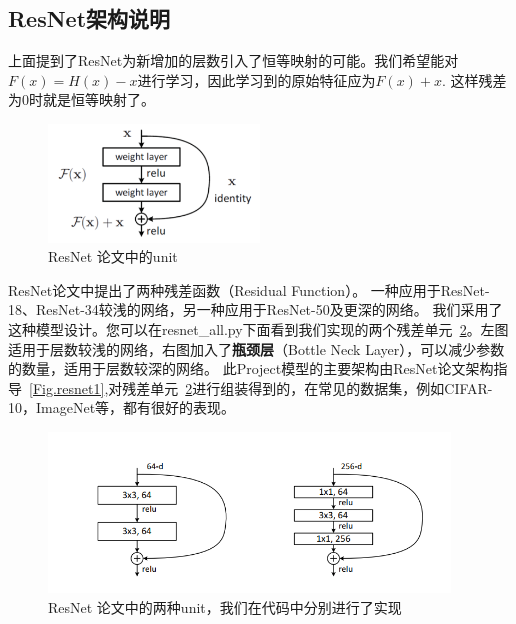 \documentclass[hyperref, UTF8, 12pt]{article}
\theoremstyle{definition}
\begin{document}
\subsection{ResNet架构说明}
上面提到了ResNet为新增加的层数引入了恒等映射的可能。我们希望能对$F(x) = H(x) - x$进行学习，因此学习到的原始特征应为$F(x) + x$. 这样残差为0时就是恒等映射了。\\
\begin{figure}[h] %
	\centering %
	\includegraphics[width=0.5\textwidth]{resnetUnit.png} %
	\caption{ResNet 论文中的unit} %
	\label{Fig.resnet2} %
\end{figure}
\indent
ResNet论文中提出了两种残差函数（Residual Function）。 一种应用于ResNet-18、ResNet-34较浅的网络，另一种应用于ResNet-50及更深的网络。 我们采用了这种模型设计。您可以在resnet\_all.py下面看到我们实现的两个残差单元~\ref{Fig.resnet4}。左图适用于层数较浅的网络，右图加入了\textbf{瓶颈层}（Bottle Neck Layer），可以减少参数的数量，适用于层数较深的网络。
此Project模型的主要架构由ResNet论文架构指导~\ref{Fig.resnet1},对残差单元~\ref{Fig.resnet4}进行组装得到的，在常见的数据集，例如CIFAR-10，ImageNet等，都有很好的表现。\\
\begin{figure}[h] %
	\centering %
	\includegraphics[width=0.95\textwidth]{resnet2units.png} %
	\caption{ResNet 论文中的两种unit，我们在代码中分别进行了实现} %
	\label{Fig.resnet4} %
\end{figure}
\end{document}
